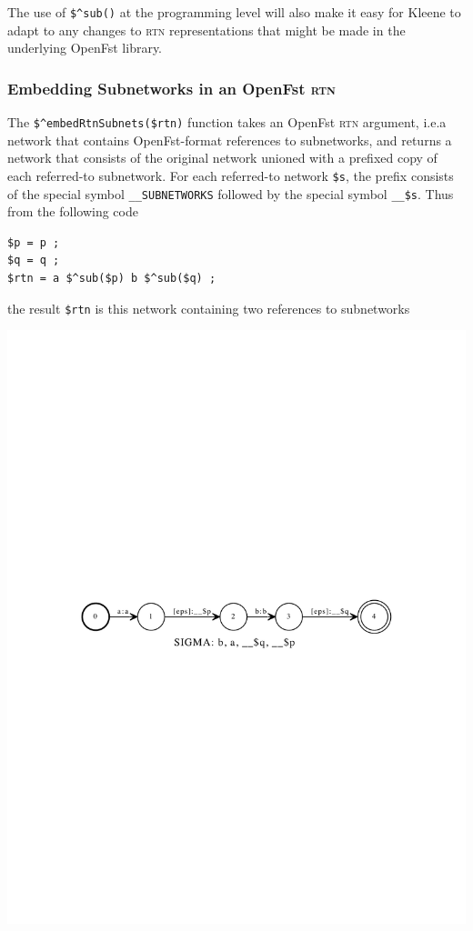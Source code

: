 \documentclass[letterpaper,12pt]{article}
\newcommand{\acro}{\textsc}
\begin{document}
\noindent
The use of \verb!$^sub()! at the programming level will also make it easy
for Kleene to adapt to any changes to \acro{rtn} representations that
might be made in the underlying OpenFst library.

\subsubsection{Embedding Subnetworks in an OpenFst \acro{rtn}}

The \verb!$^embedRtnSubnets($rtn)! function takes an OpenFst \acro{rtn}
argument, i.e.\@ a network that contains OpenFst-format references to
subnetworks, and returns a network that consists of the original network
unioned with a prefixed copy of each referred-to subnetwork.  For each
referred-to network \verb!$s!, the prefix consists of the special symbol
\verb!__SUBNETWORKS! followed by the special symbol \verb!__$s!.  Thus
from the following code

\begin{Verbatim}[fontsize=\small]
$p = p ;
$q = q ;
$rtn = a $^sub($p) b $^sub($q) ;
\end{Verbatim}

\noindent
the result \verb!$rtn! is this network containing two references to subnetworks

\begin{center}
\includegraphics[width=\textwidth]{images/twoReferences.pdf}
\end{center}
\end{document}
